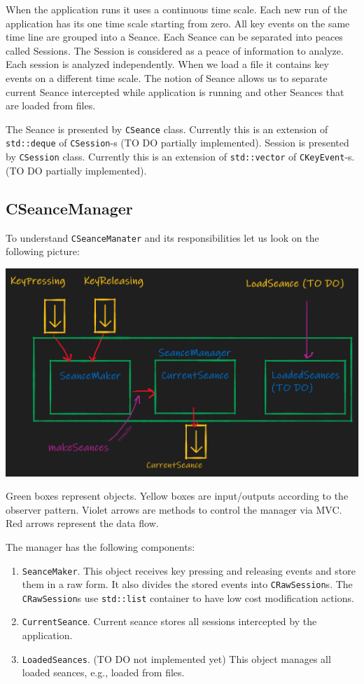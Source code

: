 \documentclass{article}
\begin{document}
When the application runs it uses a continuous time scale. Each new run of the application has its one time scale starting from zero. All key events on the same time line are grouped into a Seance. Each Seance can be separated into peaces called Sessions. The Session is considered as a peace of information to analyze. Each session is analyzed independently. When we load a file it contains key events on a different time scale. The notion of Seance allows us to separate current Seance intercepted while application is running and other Seances that are loaded from files.

The Seance is presented by \verb"CSeance" class. Currently this is an extension of \verb"std::deque" of \verb"CSession"-s (TO DO partially implemented). Session is presented by \verb"CSession" class. Currently this is an extension of \verb"std::vector" of \verb"CKeyEvent"-s. (TO DO partially implemented).


\subsection{CSeanceManager}

To understand \verb"CSeanceManater" and its responsibilities let us look on the following picture:
\begin{center}
\includegraphics[scale = 0.4]{Figures/SeanceManager.png}

Green boxes represent objects. Yellow boxes are input/outputs according to the observer pattern. Violet arrows are methods to control the manager via MVC. Red arrows represent the data flow.
\end{center}

The manager has the following components:
\begin{enumerate}
\item \verb"SeanceMaker". This object receives key pressing and releasing events and store them in a raw form. It also divides the stored events into \verb"CRawSession"s. The \verb"CRawSession"s use \verb"std::list" container to have low cost modification actions.

\item \verb"CurrentSeance". Current seance stores all sessions intercepted by the application.

\item \verb"LoadedSeances". (TO DO not implemented yet) This object manages all loaded seances, e.g., loaded from files.
\end{enumerate}
\end{document}
